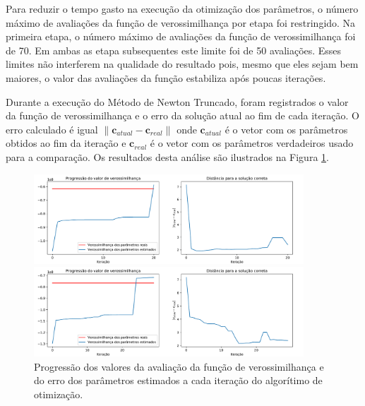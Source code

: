 Para reduzir o tempo gasto na execução da otimização dos parâmetros, o número máximo de avaliações da função de verossimilhança por etapa foi restringido.
Na primeira etapa, o número máximo de avaliações da função de verossimilhança foi de 70.
Em ambas as etapa subsequentes este limite foi de 50 avaliações.
Esses limites não interferem na qualidade do resultado pois, mesmo que eles sejam bem maiores, o valor das avaliações da função estabiliza após poucas iterações.


Durante a execução do Método de Newton Truncado, foram registrados o valor da função de verossimilhança e o erro da solução atual ao fim de cada iteração.
O erro calculado é igual $\|\mathbf{c}_{atual} - \mathbf{c}_{real}\|$ onde
$\mathbf{c}_{atual}$ é o vetor com os parâmetros obtidos ao fim da iteração e
$\mathbf{c}_{real}$ é o vetor com os parâmetros verdadeiros usado para a comparação.
Os resultados desta análise são ilustrados na Figura \ref{fig:progression_plots}.

\begin{figure}
	\centering
	\caption{Progressão dos valores da avaliação da função de verossimilhança e do erro dos parâmetros estimados a cada iteração do algorítimo de otimização.}
	\label{fig:progression_plots}
	\begin{minipage}[b]{.99\linewidth}
		\centering
		\includegraphics[width=0.90\textwidth]{./figures/results_figures/progression_plot.pdf}
	\end{minipage}

	\begin{minipage}[b]{.99\linewidth}
		\centering
		\includegraphics[width=0.90\textwidth]{./figures/results_figures/progression_plot2.pdf}
	\end{minipage}
\end{figure}

